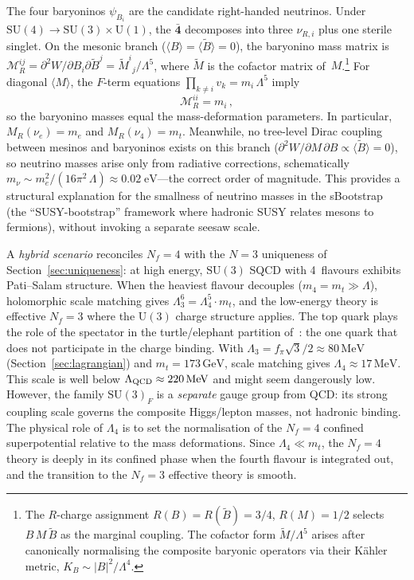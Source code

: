 \documentclass[12pt,a4paper]{article}
\newcommand{\SU}{\mathrm{SU}}
\newcommand{\UU}{\mathrm{U}}
\newcommand{\Nf}{N_f}
\newcommand{\MeV}{\,\mathrm{MeV}}
\newcommand{\GeV}{\,\mathrm{GeV}}
\begin{document}
The four baryoninos $\psi_{B_i}$ are the candidate right-handed
neutrinos. Under $\SU(4)\to\SU(3)\times\UU(1)$, the
$\bar{\mathbf{4}}$ decomposes into three $\nu_{R,i}$ plus one sterile
singlet. On the mesonic branch ($\langle B\rangle = \langle\tilde{B}\rangle = 0$),
the baryonino mass matrix is
$\mathcal{M}_{R}^{ij} = \partial^2 W/\partial B_i\partial\tilde{B}^j
= \tilde{M}^i{}_j/\Lambda^5$, where $\tilde{M}$ is the cofactor matrix
of~$M$.\footnote{The $R$-charge assignment $R(B)=R(\tilde B)=3/4$,
$R(M)=1/2$ selects $B\,M\,\tilde B$ as the marginal coupling.
The cofactor form $\tilde{M}/\Lambda^5$ arises after
canonically normalising the composite baryonic operators via
their K\"ahler metric, $K_B \sim |B|^2/\Lambda^4$.}
For diagonal $\langle M\rangle$, the $F$-term equations
$\prod_{k\ne i} v_k = m_i\,\Lambda^5$ imply
\begin{equation}
  \mathcal{M}_R^{ii} = m_i\,,
  \label{eq:baryonino_mass}
\end{equation}
so the baryonino masses equal the mass-deformation parameters. In particular,
$M_R(\nu_e) = m_e$ and $M_R(\nu_4) = m_t$. Meanwhile, no tree-level Dirac
coupling between mesinos and baryoninos exists on this branch
($\partial^2 W/\partial M\,\partial B \propto \langle\tilde{B}\rangle = 0$),
so neutrino masses arise only from radiative corrections, schematically
$m_\nu \sim m_e^2/(16\pi^2\,\Lambda) \approx 0.02\;\text{eV}$---the
correct order of magnitude. This provides a structural explanation for
the smallness of neutrino masses in the
sBootstrap~\cite{Rivero:2024epjc} (the ``SUSY-bootstrap'' framework
where hadronic SUSY relates mesons to fermions), without invoking a
separate seesaw scale.

A \emph{hybrid scenario} reconciles $\Nf=4$ with the $N=3$ uniqueness
of Section~\ref{sec:uniqueness}: at high energy, $\SU(3)$ SQCD with
4~flavours exhibits Pati--Salam structure. When the heaviest flavour
decouples ($m_4 = m_t \gg \Lambda$), holomorphic scale matching gives
$\Lambda_3^6 = \Lambda_4^5 \cdot m_t$, and the low-energy theory is
effective $\Nf = 3$ where the $\UU(3)$ charge structure applies.
The top quark plays the role of the spectator in the
turtle/elephant partition of~\cite{Rivero:2024epjc}: the one quark that
does not participate in the charge binding. With
$\Lambda_3 = f_\pi\sqrt{3}/2 \approx 80\MeV$
(Section~\ref{sec:lagrangian}) and $m_t = 173\GeV$, scale matching
gives $\Lambda_4 \approx 17\MeV$.
This scale is well below $\Lambda_{\rm QCD} \approx 220\MeV$ and
might seem dangerously low. However, the family $\SU(3)_F$ is a
\emph{separate} gauge group from QCD: its strong coupling scale
governs the composite Higgs/lepton masses, not hadronic binding.
The physical role of $\Lambda_4$ is to set the
normalisation of the $\Nf=4$ confined superpotential relative to the
mass deformations. Since $\Lambda_4 \ll m_t$, the $\Nf=4$ theory is
deeply in its confined phase when the fourth flavour is integrated out,
and the transition to the $\Nf=3$ effective theory is smooth.
\end{document}
